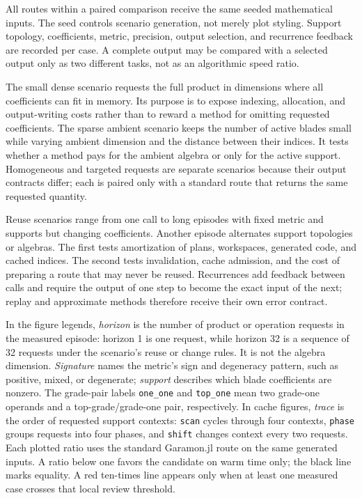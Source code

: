 \documentclass[11pt,a4paper]{article}
\newcommand{\code}[1]{\texttt{#1}}
\begin{document}
All routes within a paired comparison receive the same seeded
mathematical inputs. The seed controls scenario generation, not
merely plot styling. Support topology, coefficients, metric,
precision, output selection, and recurrence feedback are recorded
per case. A complete output may be compared with a selected output
only as two different tasks, not as an algorithmic speed ratio.

The small dense scenario requests the full product in dimensions where
all coefficients can fit in memory. Its purpose is to expose indexing,
allocation, and output-writing costs rather than to reward a method for
omitting requested coefficients. The sparse ambient scenario keeps the
number of active blades small while varying ambient dimension and the
distance between their indices. It tests whether a method pays for the
ambient algebra or only for the active support. Homogeneous and targeted
requests are separate scenarios because their output contracts differ;
each is paired only with a standard route that returns the same requested
quantity.

Reuse scenarios range from one call to long episodes with fixed metric
and supports but changing coefficients. Another episode alternates
support topologies or algebras. The first tests amortization of plans,
workspaces, generated code, and cached indices. The second tests
invalidation, cache admission, and the cost of preparing a route that
may never be reused. Recurrences add feedback between calls and require
the output of one step to become the exact input of the next; replay and
approximate methods therefore receive their own error contract.

In the figure legends, \emph{horizon} is the number of product or
operation requests in the measured episode: horizon 1 is one request,
while horizon 32 is a sequence of 32 requests under the scenario's
reuse or change rules. It is not the algebra dimension. \emph{Signature}
names the metric's sign and degeneracy pattern, such as positive,
mixed, or degenerate;
\emph{support} describes which blade coefficients are nonzero.
The grade-pair labels \code{one\_one} and \code{top\_one} mean two
grade-one operands and a top-grade/grade-one pair, respectively.
In cache figures, \emph{trace} is the order of requested support
contexts: \code{scan} cycles through four contexts, \code{phase}
groups requests into four phases, and \code{shift} changes context
every two requests. Each plotted ratio uses the standard Garamon.jl
route on the same generated inputs. A ratio below one favors the
candidate on warm time only; the black line marks equality. A red
ten-times line appears only when at least one measured case crosses
that local review threshold.
\end{document}
